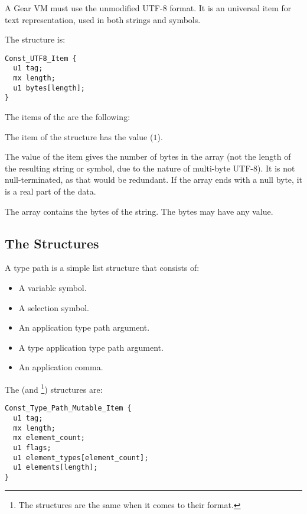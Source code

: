 A Gear VM must use the unmodified UTF-8 format. It is an universal item for text representation, used in both strings and symbols. 

The  structure is:
\begin{lstlisting}
Const_UTF8_Item {
  u1 tag;
  mx length;
  u1 bytes[length];
}
\end{lstlisting}

The items of the  are the following:
\begin{description}[font=\ttfamily\mdseries,style=nextline]
  \item[tag]
  The  item of the  structure has the value  ($1$). 
  \item[length]
  The value of the  item gives the number of bytes in the  array (not the length of the resulting string or symbol, due to the nature of multi-byte \mbox{UTF-8}). It is not null-terminated, as that would be redundant. If the array ends with a null byte, it is a real part of the data. 
  \item[bytes]
  The  array contains the bytes of the string. The bytes may have any value. 
\end{description}





\subsection{The  Structures}

A type path is a simple list structure that consists of: 
\begin{itemize}
  \item A variable symbol. 
  \item A selection symbol. 
  \item An application type path argument. 
  \item A type application type path argument. 
  \item An application comma.
\end{itemize}

The  (and \footnote{The structures are the same when it comes to their format.}) structures are:
\begin{lstlisting}
Const_Type_Path_Mutable_Item {
  u1 tag;
  mx length;
  mx element_count;
  u1 flags;
  u1 element_types[element_count];
  u1 elements[length];
}
\end{lstlisting}

